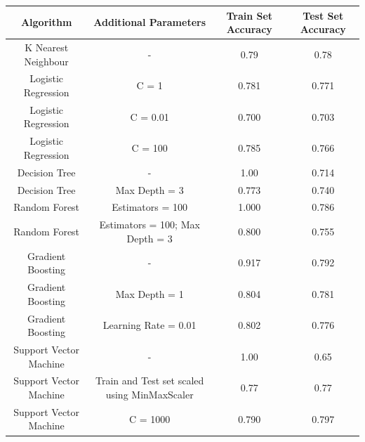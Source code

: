 \documentclass[12pt]{article}
\begin{document}
{
\clearpage
\thispagestyle{empty}
\begin{landscape}
\centering
\begin{table}[]
\begin{tabular}{|c|c|c|c|}
\hline
Algorithm              & Additional Parameters                              & Train Set Accuracy & Test Set Accuracy \\ \hline
K Nearest Neighbour    & -                                                  & 0.79               & 0.78              \\ \hline
Logistic Regression    & C = 1                                              & 0.781              & 0.771             \\ \hline
Logistic Regression    & C = 0.01                                           & 0.700              & 0.703             \\ \hline
Logistic Regression    & C = 100                                            & 0.785              & 0.766             \\ \hline
Decision Tree          & -                                                  & 1.00               & 0.714             \\ \hline
Decision Tree          & Max Depth = 3                                      & 0.773              & 0.740             \\ \hline
Random Forest          & Estimators = 100                                   & 1.000              & 0.786             \\ \hline
Random Forest          & Estimators = 100; Max Depth = 3                    & 0.800              & 0.755             \\ \hline
Gradient Boosting      & -                                                  & 0.917              & 0.792             \\ \hline
Gradient Boosting      & Max Depth = 1                                      & 0.804              & 0.781             \\ \hline
Gradient Boosting      & Learning Rate = 0.01                               & 0.802              & 0.776             \\ \hline
Support Vector Machine & -                                                  & 1.00               & 0.65              \\ \hline
Support Vector Machine & Train and Test set scaled using MinMaxScaler       & 0.77               & 0.77              \\ \hline
Support Vector Machine & C = 1000                                           & 0.790              & 0.797             \\ \hline

\end{tabular}
\end{table}
\end{landscape}}
\end{document}
